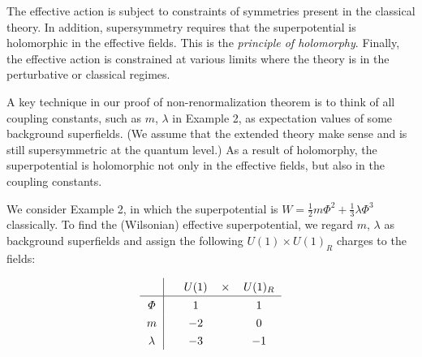 \documentclass[lecture]{qft-l}
\newcommand{\lam}{\lambda}
\newcommand{\PHI}{\varPhi}
\newcommand{\inv}[1]{\frac{1}{#1}}
\newcommand{\hf}{{\textstyle \inv{2}}}
\numberwithin{figure}{chapter}
\begin{document}
The effective action is subject to constraints of symmetries present in the 
classical theory.
In addition, supersymmetry requires that the superpotential is holomorphic 
in the effective fields.
This is the {\em principle of holomorphy}.
Finally, the effective action is constrained at various limits
where the theory is in the perturbative or classical regimes.

A key technique in our proof of non-renormalization theorem is to think of
all coupling constants, such as $m$, $\lam$ in Example 2, as expectation
values of some background superfields.
(We assume that the extended theory make sense and is still supersymmetric
at the quantum level.)
As a result of holomorphy, the superpotential is holomorphic not only in
the effective fields, but also in the coupling constants.

We consider Example 2, in which the superpotential is
$W=\hf m\PHI^2+\inv{3}\lam\PHI^3$ classically.
To find the (Wilsonian) effective superpotential, we regard $m$, $\lam$
as background superfields and assign the following $U(1)\times U(1)_R$
charges to the fields:

\bigskip
\begin{equation}
\renewcommand{\arraystretch}{1.3}
\begin{tabular}{c|cccc}
&	&    $U(1)$	&   $\times$	&   $U(1)_R$\\
		\hline
$\PHI$	&	&      $1$	&		&     $1$	\\
$m$	&	&     $-2$	&		&     $0$	\\
$\lam$	&	&     $-3$	&		&     $-1$
\end{tabular}
\end{equation}
\end{document}

